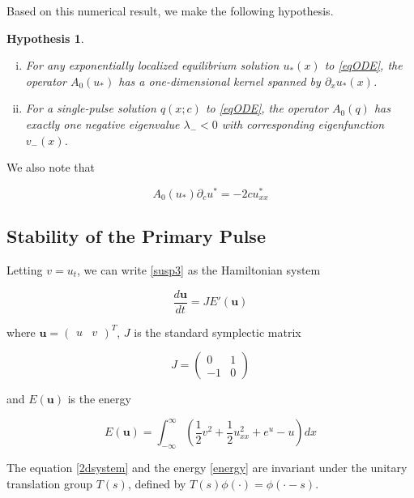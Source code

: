 \documentclass[12pt]{article}
\newtheorem{hypothesis}{Hypothesis}
\begin{document}
Based on this numerical result, we make the following hypothesis.

\begin{hypothesis}\label{hyp_A0neg}
\begin{enumerate}[(i)]
\mbox{}
\item For any exponentially localized equilibrium solution $u_*(x)$ to \eqref{eqODE}, the operator $A_0(u_*)$ has a one-dimensional kernel spanned by $\partial_x u_*(x)$. 
\item For a single-pulse solution $q(x; c)$ to \eqref{eqODE}, the operator $A_0(q)$ has exactly one negative eigenvalue $\lambda_- < 0$ with corresponding eigenfunction $v_-(x)$.
\end{enumerate}
\end{hypothesis}

We also note that 

\begin{equation}\label{uc}
A_0(u_*) \partial_c u^* = -2 c u^*_{xx}
\end{equation}

\subsection{Stability of the Primary Pulse}

Letting $v = u_t$, we can write \eqref{susp3} as the Hamiltonian system

\begin{equation}\label{2dsystem}
\frac{d \textbf{u} }{dt} = J E'(\textbf{u})
\end{equation}

where $\textbf{u} = \begin{pmatrix}u&v\end{pmatrix}^T$, $J$ is the standard symplectic matrix

\begin{equation*}
J = \begin{pmatrix}0 & 1 \\ -1 & 0 \end{pmatrix}
\end{equation*}

and $E(\textbf{u})$ is the energy

\begin{equation}\label{energy}
E(\textbf{u}) = \int_{-\infty}^\infty \left(\frac{1}{2} v^2 + \frac{1}{2}u_{xx}^2 + e^{u} - u \right)dx
\end{equation}

The equation \eqref{2dsystem} and the energy \eqref{energy} are invariant under the unitary translation group $T(s)$, defined by $T(s)\phi(\cdot) = \phi(\cdot - s)$. \\
\end{document}
